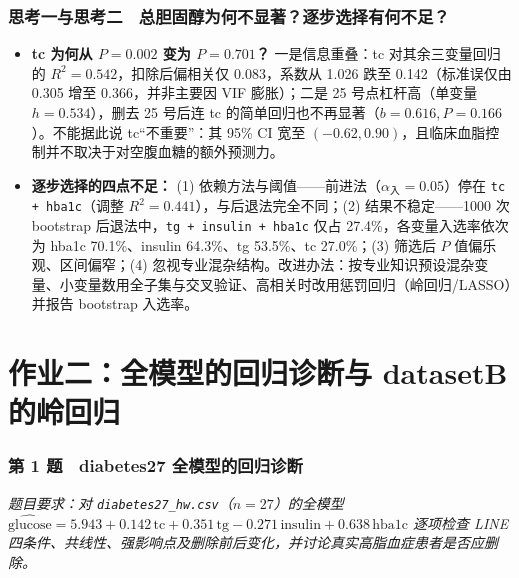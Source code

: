\subsubsection*{思考一与思考二　总胆固醇为何不显著？逐步选择有何不足？}


\begin{itemize}
\item \textbf{tc 为何从 $P=0.002$ 变为 $P=0.701$？} 一是信息重叠：tc 对其余三变量回归的 $R^2=0.542$，扣除后偏相关仅 0.083，系数从 1.026 跌至 0.142（标准误仅由 0.305 增至 0.366，并非主要因 VIF 膨胀）；二是 25 号点杠杆高（单变量 $h=0.534$），删去 25 号后连 tc 的简单回归也不再显著（$b=0.616,P=0.166$）。不能据此说 tc“不重要”：其 95\% CI 宽至 $(-0.62,0.90)$，且临床血脂控制并不取决于对空腹血糖的额外预测力。
\item \textbf{逐步选择的四点不足：} (1) 依赖方法与阈值——前进法（$\alpha_{}=0.05$）停在 \texttt{tc + hba1c}（调整 $R^2=0.441$），与后退法完全不同；(2) 结果不稳定——1000 次 bootstrap 后退法中，\texttt{tg + insulin + hba1c} 仅占 27.4\%，各变量入选率依次为 hba1c 70.1\%、insulin 64.3\%、tg 53.5\%、tc 27.0\%；(3) 筛选后 $P$ 值偏乐观、区间偏窄；(4) 忽视专业混杂结构。改进办法：按专业知识预设混杂变量、小变量数用全子集与交叉验证、高相关时改用惩罚回归（岭回归/LASSO）并报告 bootstrap 入选率。
\end{itemize}

\section{作业二：全模型的回归诊断与 datasetB 的岭回归}

\subsubsection*{第 1 题　diabetes27 全模型的回归诊断}
\emph{题目要求：对 \texttt{diabetes27\_hw.csv}（$n=27$）的全模型 $\widehat{\text{glucose}}=5.943+0.142\,\text{tc}+0.351\,\text{tg}-0.271\,\text{insulin}+0.638\,\text{hba1c}$ 逐项检查 LINE 四条件、共线性、强影响点及删除前后变化，并讨论真实高脂血症患者是否应删除。}

